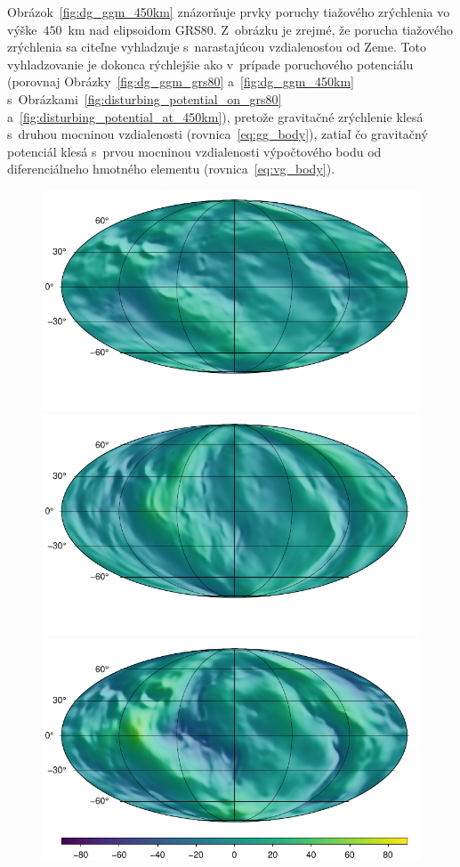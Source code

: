 \documentclass[a4paper, 12pt]{book}
\begin{document}
Obrázok~\ref{fig:dg_ggm_450km} znázorňuje prvky poruchy tiažového zrýchlenia vo 
výške~$450$~km nad elipsoidom GRS80.  Z~obrázku je zrejmé, že porucha tiažového 
zrýchlenia sa citeľne vyhladzuje s~narastajúcou vzdialenosťou od Zeme.  Toto 
vyhladzovanie je dokonca rýchlejšie ako v~prípade poruchového potenciálu 
(porovnaj Obrázky~\ref{fig:dg_ggm_grs80} a~\ref{fig:dg_ggm_450km} 
s~Obrázkami~\ref{fig:disturbing_potential_on_grs80} 
a~\ref{fig:disturbing_potential_at_450km}), pretože gravitačné zrýchlenie klesá 
s~druhou mocninou vzdialenosti (rovnica~\ref{eq:gg_body}), zatiaľ čo gravitačný 
potenciál klesá s~prvou mocninou vzdialenosti výpočtového bodu od 
diferenciálneho hmotného elementu (rovnica~\ref{eq:vg_body}).

\begin{figure}
\centering
\includegraphics{./fig-gravity-disturbance-at-450km-x.pdf}
\includegraphics{./fig-gravity-disturbance-at-450km-y.pdf}
\includegraphics{./fig-gravity-disturbance-at-450km-z.pdf}

\end{figure}
\end{document}
